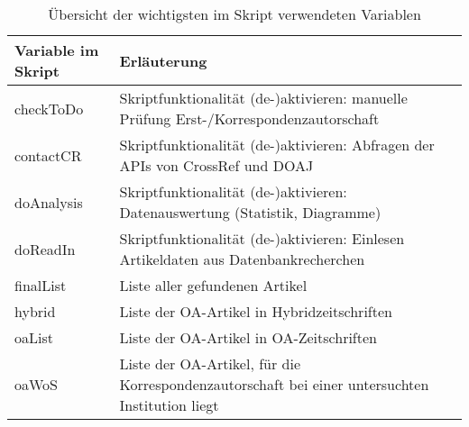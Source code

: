 \begin{appendices}
\begin{table}[h]
\caption{Übersicht der wichtigsten im Skript verwendeten Variablen}
    \begin{tabularx}{1\textwidth}{p{5cm}p{9cm}}
    \toprule
     Variable im Skript & Erläuterung \\
     \midrule
checkToDo & Skriptfunktionalität (de-)aktivieren: manuelle Prüfung Erst-/Korrespondenzautorschaft\\
contactCR & Skriptfunktionalität (de-)aktivieren: Abfragen der APIs von CrossRef und DOAJ \\
doAnalysis & Skriptfunktionalität (de-)aktivieren: Datenauswertung (Statistik, Diagramme)\\
doReadIn & Skriptfunktionalität (de-)aktivieren: Einlesen Artikeldaten aus Datenbankrecherchen\\
finalList & Liste aller gefundenen Artikel\\
hybrid &  Liste der OA-Artikel in Hybridzeitschriften\\
oaList &  Liste der OA-Artikel in OA-Zeitschriften\\
oaWoS & Liste der OA-Artikel, für die Korrespondenzautorschaft bei einer untersuchten Institution liegt\\
    \bottomrule
    \end{tabularx}
\end{table}


\end{appendices}
